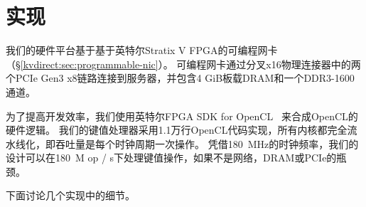 \section{实现}
\label{kvdirect:sec:implementation}



我们的硬件平台基于基于英特尔Stratix V FPGA的可编程网卡（\S \ref {kvdirect:sec:programmable-nic}）。
可编程网卡通过分叉x16物理连接器中的两个PCIe Gen3 x8链路连接到服务器，并包含4 GiB板载DRAM和一个DDR3-1600通道。

为了提高开发效率，我们使用英特尔FPGA SDK for OpenCL~ \cite {aoc}来合成OpenCL的硬件逻辑。
我们的键值处理器采用1.1万行OpenCL代码实现，所有内核都完全流水线化，即吞吐量是每个时钟周期一次操作。
凭借180~MHz的时钟频率，我们的设计可以在180~M op / s下处理键值操作，如果不是网络，DRAM或PCIe的瓶颈。
%

下面讨论几个实现中的细节。


